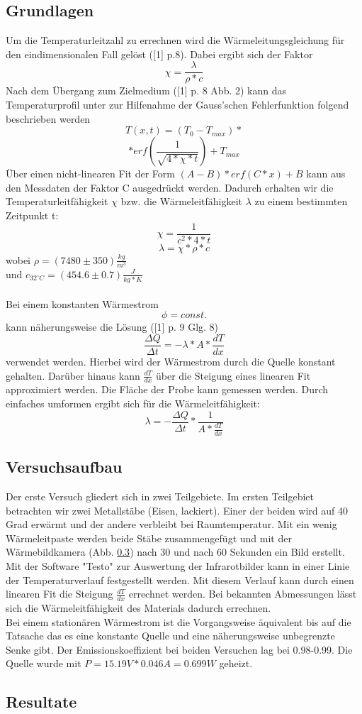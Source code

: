 \documentclass[12pt,a4paper]{article}
\begin{document}
\begin{multicols}{2}
\subsection{Grundlagen}
Um die Temperaturleitzahl zu errechnen wird die Wärmeleitungsgleichung für den eindimensionalen Fall gelöst ([1] p.8). Dabei ergibt sich der Faktor 
$$\chi = \frac{\lambda}{\rho*c}$$
Nach dem Übergang zum Zielmedium ([1] p. 8 Abb. 2) kann das Temperaturprofil unter zur Hilfenahme der Gauss'schen  Fehlerfunktion folgend beschrieben werden
$$T(x,t) = (T_0 - T_{max}) * $$
$$ * erf(\frac{1}{\sqrt{4 * \chi * t}})+T_{max}$$
Über einen nicht-linearen Fit der Form $(A-B) * erf(C * x) + B$ kann aus den Messdaten der Faktor C ausgedrückt werden.
Dadurch erhalten wir die Temperaturleitfähigkeit $\chi$ bzw. die Wärmeleitfähigkeit $\lambda$ zu einem bestimmten Zeitpunkt t:
$$\chi = \frac{1}{c^2 * 4 * t}$$
$$\lambda = \chi * \rho * c$$
wobei $\rho = (7480 \pm 350)\frac{kg}{m^3}$\\ 
und $c_{32^{\circ}C} = (454.6 \pm 0.7)\frac{J}{kg * K}$\\
\\
Bei einem konstanten Wärmestrom
$$\phi = const.$$
kann näherungsweise die Lösung ([1] p. 9 Glg. 8) 
$$\frac{\Delta Q}{\Delta t} = -\lambda * A * \frac{dT}{dx}$$
verwendet werden.
Hierbei wird der Wärmestrom durch die Quelle konstant gehalten. Darüber hinaus kann $\frac{dT}{dx}$ über die Steigung eines linearen Fit approximiert werden.
Die Fläche der Probe kann gemessen werden. Durch einfaches umformen ergibt sich für die Wärmeleitfähigkeit:
$$ \lambda = - \frac{\Delta Q}{\Delta t} * \frac{1}{A * \frac{dT}{dx}} $$
\subsection{Versuchsaufbau}
Der erste Versuch gliedert sich in zwei Teilgebiete. Im ersten Teilgebiet betrachten wir zwei Metallstäbe (Eisen, lackiert). Einer der beiden wird auf 40 Grad erwärmt und der andere verbleibt bei Raumtemperatur. Mit ein wenig Wärmeleitpaste werden beide Stäbe zusammengefügt und mit der Wärmebildkamera (Abb. \ref{}) nach 30 und nach 60 Sekunden ein Bild erstellt.\\
Mit der Software "Testo" zur Auswertung der Infrarotbilder kann in einer Linie der Temperaturverlauf festgestellt werden.
Mit diesem Verlauf kann durch einen linearen Fit die Steigung $\frac{dT}{dx}$ errechnet werden. Bei bekannten Abmessungen lässt sich die Wärmeleitfähigkeit des Materials dadurch errechnen. \\
Bei einem stationären Wärmestrom ist die Vorgangsweise äquivalent bis auf die Tatsache das es eine konstante Quelle und eine näherungsweise unbegrenzte Senke gibt.
Der Emissionskoeffizient bei beiden Versuchen lag bei 0.98-0.99.
Die Quelle wurde mit $P = 15.19V * 0.046A = 0.699 W$ geheizt.
\subsection{Resultate}

\end{multicols}
\end{document}
